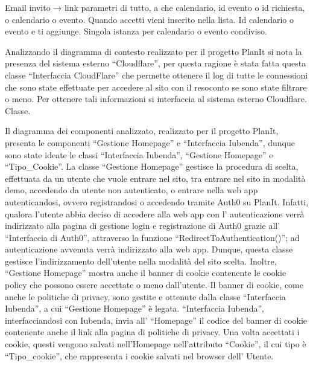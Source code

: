 \begin{listaPersonale}[DCL]{}
\begin{listaPersonale2}[DCL]{}
        Email invito → link parametri di tutto, a che calendario, id evento o id richiesta, o calendario o evento. Quando accetti vieni inserito nella lista. Id calendario o evento e ti aggiunge. Singola istanza per calendario o evento condiviso.

    \end{listaPersonale2}



    Analizzando il diagramma di contesto realizzato per il progetto PlanIt si nota la presenza del sistema esterno “Cloudflare”, per questa ragione è stata fatta questa classe “Interfaccia CloudFlare” che permette ottenere il log di tutte le connessioni che sono state effettuate per accedere al sito con il resoconto se sono state filtrare o meno. Per ottenere tali informazioni si interfaccia al sistema esterno Cloudflare. Classe.



    Il diagramma dei componenti analizzato, realizzato per il progetto PlanIt, presenta le componenti “Gestione Homepage” e “Interfaccia Iubenda”, dunque sono state ideate le classi “Interfaccia Iubenda”, “Gestione Homepage” e “Tipo\_Cookie”.
    La classe “Gestione Homepage” gestisce la procedura di scelta, effettuata da un utente che vuole entrare nel sito, tra entrare nel sito in modalità demo, accedendo da utente non autenticato, o entrare nella web app autenticandosi, ovvero registrandosi o accedendo tramite Auth0 su PlanIt. Infatti, qualora l'utente abbia deciso di accedere alla web app con l' autenticazione verrà indirizzato alla pagina di gestione login e registrazione di Auth0 grazie all' “Interfaccia di Auth0”, attraverso la funzione “RedirectToAuthentication()”; ad autenticazione avvenuta verrà indirizzato alla web app. Dunque, questa classe gestisce l'indirizzamento dell'utente nella modalità del sito scelta. Inoltre, “Gestione Homepage” mostra anche il banner di cookie contenente le cookie policy che possono essere accettate o meno dall'utente. Il banner di cookie, come anche le politiche di privacy, sono gestite e ottenute dalla classe “Interfaccia Iubenda”, a cui “Gestione Homepage” è legata. “Interfaccia Iubenda”, interfacciandosi con Iubenda, invia all' “Homepage” il codice del banner di cookie contenente anche il link alla pagina di politiche di privacy. Una volta accettati i cookie, questi vengono salvati nell'Homepage nell'attributo “Cookie”, il cui tipo è “Tipo\_cookie”, che rappresenta i cookie salvati nel browser dell' Utente.


\end{listaPersonale}
